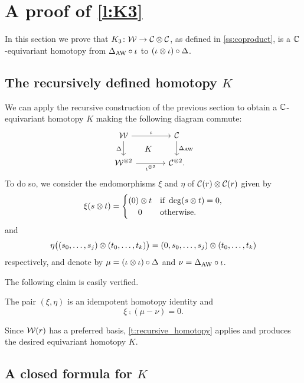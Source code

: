 
\section{A proof of \cref{l:K3}}\label{s:postponed}

In this section we prove that $K_3 \colon \mathcal{W} \to \mathcal{C} \otimes \mathcal{C}$, as defined in \cref{ss:coproduct}, is a $\mathbb{C}$-equivariant homotopy from $\Delta_{\operatorname{AW}} \mathbin{\circ} \iota$ to $(\iota \otimes \iota) \mathbin{\circ} \Delta$.

\subsection{The recursively defined homotopy $K$}

We can apply the recursive construction of the previous section to obtain a $\mathbb{C}$-equivariant homotopy $K$ making the following diagram commute:
\begin{equation*}
	\begin{tikzcd}[column sep=large]
		\cW \arrow[r,"\iota"] \arrow[d,"\Delta"'] \arrow[dr,phantom,"K"]&
		\cC \arrow[d,"\Delta_{\AW}"] \\
		\cW^{\ot 2} \arrow[r,"\iota^{\ot 2}"'] &
		\cC^{\ot 2}.
	\end{tikzcd}
\end{equation*}
To do so, we consider the endomorphisms $\xi$ and $\eta$ of $\mathcal{C}(r) \otimes \mathcal{C}(r)$ given by
\[
\xi(s \ot t) =
\begin{cases}
	(0) \ot t & \text{if } \deg(s \ot t) = 0, \\
	\hfil0 & \text{otherwise}.
\end{cases}
\]
and
\[
\eta \big((s_0,\dots,s_j) \otimes (t_0,\dots,t_k)\big) = (0,s_0,\dots,s_j) \otimes (t_0,\dots,t_k)
\]
respectively, and denote by $\mu = (\iota \otimes \iota) \mathbin{\circ} \Delta$ and $\nu = \Delta_{\operatorname{AW}} \mathbin{\circ} \iota$.

The following claim is easily verified.
\begin{lemma}
	The pair $(\xi,\eta)$ is an idempotent homotopy identity and
	\[
	\xi \comp (\mu - \nu) = 0.
	\]
\end{lemma}
Since $\mathcal{W}(r)$ has a preferred basis, \cref{t:recursive_homotopy} applies and produces the desired equivariant homotopy $K$.

\subsection{A closed formula for $K$}\label{ss:closed formula for K}

